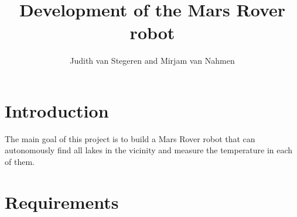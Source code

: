 \documentclass[11pt,a4paper]{article}
\author{Judith van Stegeren and Mirjam van Nahmen}
\title{Development of the Mars Rover robot}
\begin{document}
\maketitle

 
\section{Introduction}
The main goal of this project is to build a Mars Rover robot that can autonomously find all lakes in the vicinity and measure the temperature in each of them.

\section{Requirements}
\end{document}
